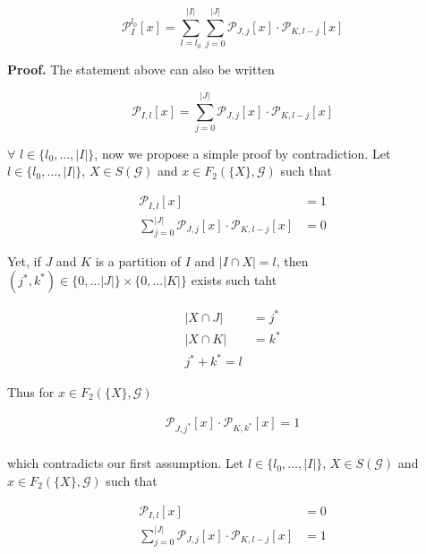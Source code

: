 \documentclass[a4paper, 11pt]{article}
\begin{document}
\begin{equation*}
\mathcal{P}_I^{l_0}\left[ x \right] = \sum_{l=l_0}^{\vert I \vert} \sum_{j=0}^{\vert J \vert} \mathcal{P}_{J, j}\left[ x \right]  \cdot \mathcal{P}_{K, l - j}\left[ x \right] 
\end{equation*} 

\textbf{Proof.} The statement above can also be written

\begin{equation*}
\mathcal{P}_{I,l} \left[ x \right] = \sum_{j=0}^{\vert J \vert} \mathcal{P}_{J, j}\left[ x \right]  \cdot \mathcal{P}_{K, l - j}\left[ x \right] 
\end{equation*} 

$\forall$ $l\in \{l_0, \ldots, \vert I\vert\}$, now we propose a simple proof by contradiction. Let $l\in \{l_0, \ldots, \vert I\vert\}$, $X \in S(\mathcal{G})$ and $x \in F_2(\{X\}, \mathcal{G})$ such that

\begin{align*}
\mathcal{P}_{I,l} \left[ x \right] &= 1\\
\sum_{j=0}^{\vert J \vert} \mathcal{P}_{J, j}\left[ x \right]  \cdot \mathcal{P}_{K, l - j}\left[ x \right] &= 0
\end{align*}

Yet, if $J$ and $K$ is a partition of $I$ and $\vert I \cap X \vert = l$, then $(j^{*}, k^{*}) \in \{0, \ldots \vert J \vert \} \times \{ 0, \ldots \vert K \vert\}$ exists such taht

\begin{align*}
\vert X \cap J \vert &= j^{*}\\
\vert X \cap K \vert &= k^{*}\\
j^{*} + k^{*} = l
\end{align*}

Thus for $x \in  F_2(\{ X \}, \mathcal{G})$ 

\begin{align*}
\mathcal{P}_{J, j^{*}}\left[ x \right] \cdot \mathcal{P}_{K, k^{*}}\left[ x \right] = 1\\
\end{align*}

which contradicts our first assumption. Let $l \in \{l_0, \ldots, \vert I \vert\}$, $X \in S(\mathcal{G})$ and $x \in F_2(\{X\}, \mathcal{G})$ such that

\begin{align*}
\mathcal{P}_{I,l} \left[ x \right] &= 0\\
\sum_{j=0}^{\vert J \vert} \mathcal{P}_{J, j}\left[ x \right]  \cdot \mathcal{P}_{K, l - j}\left[ x \right] &= 1
\end{align*}
\end{document}
